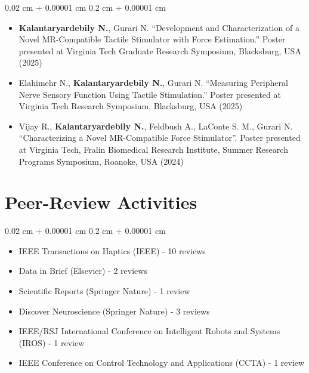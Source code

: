 \documentclass[10pt, letterpaper]{article}
\newenvironment{highlights}{
    \begin{itemize}[
        topsep=0.10 cm,
        parsep=0.10 cm,
        partopsep=0pt,
        itemsep=0pt,
        leftmargin=0.2 cm + 10pt
    ]
}{
    \end{itemize}
} %
\newenvironment{onecolentry}{
    \begin{adjustwidth}{
        0.02 cm + 0.00001 cm
    }{
        0.2 cm + 0.00001 cm
    }
}{
    \end{adjustwidth}
} %
\begin{document}
\begin{onecolentry}
\begin{highlights}

\textbf{----------------------------------------------------- Non-Peer-Reviewed Abstract Publications ------------------------------------------------------}
\item \textbf{Kalantaryardebily N.}, Gurari N. ``Development and Characterization of a Novel MR-Compatible Tactile Stimulator with Force Estimation.'' Poster presented at Virginia Tech Graduate Research Symposium, Blacksburg, USA (2025)
\item Elahimehr N., \textbf{Kalantaryardebily N.}, Gurari N. ``Measuring Peripheral Nerve Sensory Function Using Tactile Stimulation.'' Poster presented at Virginia Tech Research Symposium, Blacksburg, USA (2025)
\item Vijay R., \textbf{Kalantaryardebily N.}, Feldbush A., LaConte S. M., Gurari N. ``Characterizing a Novel MR-Compatible Force Stimulator''. Poster presented at Virginia Tech, Fralin Biomedical Research Institute, Summer Research Programs Symposium, Roanoke, USA (2024)


\end{highlights}
\end{onecolentry}


\section{Peer-Review Activities}
\begin{onecolentry}
\vspace{-.5em}
\begin{highlights}
    \item IEEE Transactions on Haptics (IEEE) - 10 reviews %
    \item Data in Brief (Elsevier) - 2 reviews
    \item Scientific Reports (Springer Nature) - 1 review
    \item Discover Neuroscience (Springer Nature) - 3 reviews
    \item IEEE/RSJ International Conference on Intelligent Robots and Systems (IROS) - 1 review
    \item IEEE Conference on Control Technology and Applications (CCTA) - 1 review
\end{highlights}
\end{onecolentry}
\end{document}
